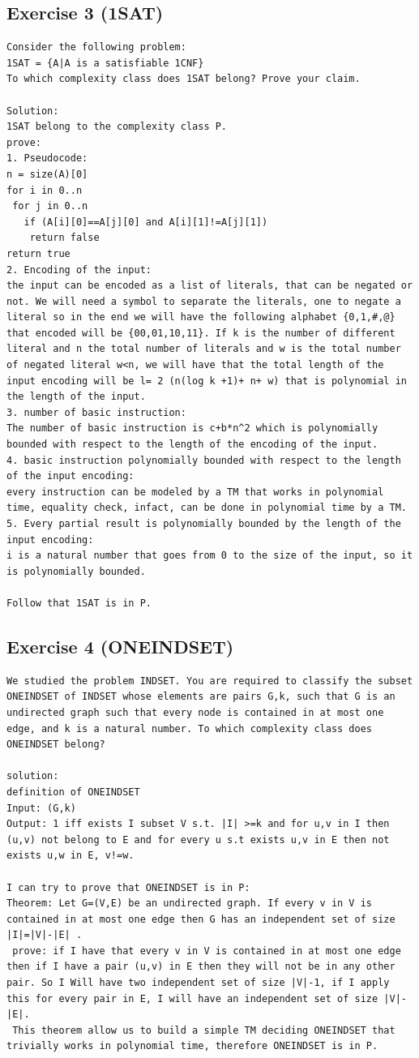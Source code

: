 \subsection{Exercise 3 (1SAT)}
\begin{lstlisting}[breaklines]
Consider the following problem:
1SAT = {A|A is a satisfiable 1CNF}
To which complexity class does 1SAT belong? Prove your claim.

Solution:
1SAT belong to the complexity class P.
prove:
1. Pseudocode:
n = size(A)[0]
for i in 0..n
 for j in 0..n
   if (A[i][0]==A[j][0] and A[i][1]!=A[j][1])
    return false
return true
2. Encoding of the input:
the input can be encoded as a list of literals, that can be negated or not. We will need a symbol to separate the literals, one to negate a literal so in the end we will have the following alphabet {0,1,#,@} that encoded will be {00,01,10,11}. If k is the number of different literal and n the total number of literals and w is the total number of negated literal w<n, we will have that the total length of the input encoding will be l= 2 (n(log k +1)+ n+ w) that is polynomial in the length of the input.
3. number of basic instruction:
The number of basic instruction is c+b*n^2 which is polynomially bounded with respect to the length of the encoding of the input.
4. basic instruction polynomially bounded with respect to the length of the input encoding:
every instruction can be modeled by a TM that works in polynomial time, equality check, infact, can be done in polynomial time by a TM.
5. Every partial result is polynomially bounded by the length of the input encoding:
i is a natural number that goes from 0 to the size of the input, so it is polynomially bounded.

Follow that 1SAT is in P.
\end{lstlisting}
\subsection{Exercise 4 (ONEINDSET)}
\begin{lstlisting}[breaklines]
We studied the problem INDSET. You are required to classify the subset ONEINDSET of INDSET whose elements are pairs G,k, such that G is an undirected graph such that every node is contained in at most one edge, and k is a natural number. To which complexity class does ONEINDSET belong?

solution:
definition of ONEINDSET 
Input: (G,k)
Output: 1 iff exists I subset V s.t. |I| >=k and for u,v in I then (u,v) not belong to E and for every u s.t exists u,v in E then not exists u,w in E, v!=w.

I can try to prove that ONEINDSET is in P:
Theorem: Let G=(V,E) be an undirected graph. If every v in V is contained in at most one edge then G has an independent set of size |I|=|V|-|E| .
 prove: if I have that every v in V is contained in at most one edge then if I have a pair (u,v) in E then they will not be in any other pair. So I Will have two independent set of size |V|-1, if I apply this for every pair in E, I will have an independent set of size |V|-|E|.
 This theorem allow us to build a simple TM deciding ONEINDSET that trivially works in polynomial time, therefore ONEINDSET is in P.
\end{lstlisting}

